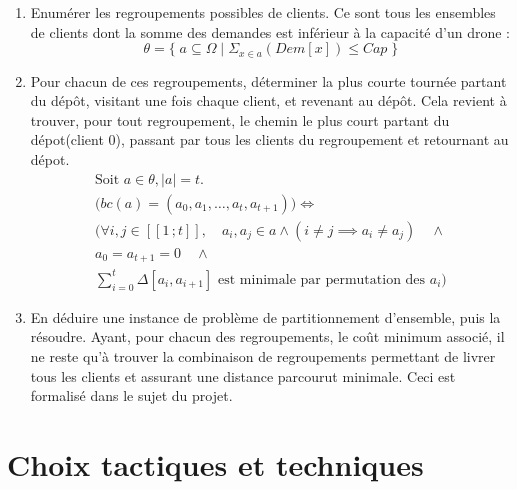 \documentclass[a4paper,10pt]{report}
\newcommand{\segm}[1]{[\![1\,;#1]\!]}
\begin{document}
\begin{enumerate}

\item Enumérer les regroupements possibles de clients. Ce sont tous les ensembles de clients dont la somme des demandes est inférieur à la capacité d'un drone :
\begin{equation*}
  \theta = \{\; a \subseteq \Omega \mid \Sigma_{x \in a}^{} (Dem[x]) \le Cap \; \}
\end{equation*}

\item Pour chacun de ces regroupements, déterminer la plus courte tournée partant du dépôt, visitant une fois chaque client, et revenant au dépôt. Cela revient à trouver, pour tout regroupement, le chemin le plus court partant du dépot(client $0$), passant par tous les clients du regroupement et retournant au dépot.
\begin{equation*}
  \begin{array}{l}
    \text{Soit } a \in \theta, |a| = t.\\
    \big(bc(a) = (a_0, a_1, \ldots, a_t, a_{t+1}) \big) \iff\\
    \big(\forall i,j \in \segm{t},\quad a_i,a_j \in a \land (i \neq j \implies a_i \neq a_j) \quad\land\\ 
    a_0 = a_{t+1} = 0 \quad\land\\
    \sum_{i=0}^{t} \Delta[a_i,a_{i+1}] \text{ est minimale par permutation des $a_i$}\big)
    \end{array}
\end{equation*}

\item En déduire une instance de problème de partitionnement d’ensemble, puis la résoudre. Ayant, pour chacun des regroupements, le coût minimum associé, il ne reste qu'à trouver la combinaison de regroupements permettant de livrer tous les clients et assurant une distance parcourut minimale. Ceci est formalisé dans le sujet du projet.

\end{enumerate}

\section{Choix tactiques et techniques}
\end{document}
